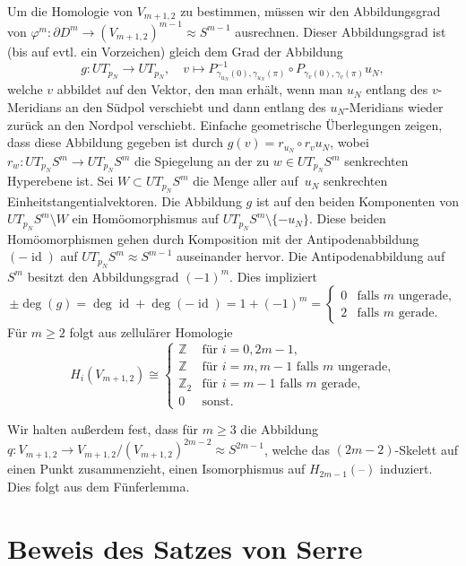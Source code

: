 \documentclass[11pt, a4paper, german]{article}
\theoremstyle{definition}
\theoremstyle{remark}
\newcommand{\R}{\mathbb{R}} %
\newcommand{\Z}{\mathbb{Z}} %
\DeclareMathOperator{\id}{id} %
\newcommand{\blank}{\text{--}} %
\newcommand{\V}[2]{V_{{#2},{#1}}} %
\newcommand{\homeo}{\approx} %
\begin{document}
Um die Homologie von $\V{2}{m+1}$ zu bestimmen, müssen wir den Abbildungsgrad von $\varphi^m : \partial D^m \to (\V{2}{m+1})^{m-1} \homeo S^{m-1}$ ausrechnen.
Dieser Abbildungsgrad ist (bis auf evtl. ein Vorzeichen) gleich dem Grad der Abbildung
\[
  g : UT_{p_N} \to UT_{p_N}, \quad
  v \mapsto P_{\gamma_{u_N}(0),\gamma_{u_N}(\pi)}^{-1} \circ P_{\gamma_v(0),\gamma_v(\pi)} u_N,
\]
welche $v$ abbildet auf den Vektor, den man erhält, wenn man $u_N$ entlang des $v$-Meridians an den Südpol verschiebt und dann entlang des $u_N$-Meridians wieder zurück an den Nordpol verschiebt.
Einfache geometrische Überlegungen zeigen, dass diese Abbildung gegeben ist durch $g(v) = r_{u_N} \circ r_{v} u_N$, wobei $r_w : UT_{p_N} S^m \to UT_{p_N} S^m$ die Spiegelung an der zu $w \in UT_{p_N} S^m$ senkrechten Hyperebene ist.
Sei $W \subset UT_{p_N} S^m$ die Menge aller auf~$u_N$ senkrechten Einheitstangentialvektoren.
Die Abbildung $g$ ist auf den beiden Komponenten von $UT_{p_N} S^m \setminus W$ ein Homöomorphismus auf $UT_{p_N} S^m \setminus \{ -u_N \}$.
Diese beiden Homöomorphismen gehen durch Komposition mit der Antipodenabbildung $(- \id)$ auf $UT_{p_N} S^m \homeo S^{m-1}$ auseinander hervor.
Die Antipodenabbildung auf~$S^m$ besitzt den Abbildungsgrad $(-1)^m$.
Dies impliziert
\[
  \pm \deg(g) = \deg \id + \deg (-\id) = 1 + (-1)^m = \begin{cases}
    0 & \text{falls $m$ ungerade,} \\
    2 & \text{falls $m$ gerade.}
  \end{cases}
\]
Für $m \geq 2$ folgt aus zellulärer Homologie
\[
  H_i(\V{2}{m+1}) \cong \begin{cases}
    \Z & \text{für } i = 0, 2m-1, \\
    \Z & \text{für } i = m, m-1 \text{ falls $m$ ungerade,} \\
    \Z_2 & \text{für } i = m-1 \text{ falls $m$ gerade,} \\
    0 & \text{sonst.}
  \end{cases}
\]

Wir halten außerdem fest, dass für $m \geq 3$ die Abbildung $q : \V{2}{m+1} \to \V{2}{m+1} / (\V{2}{m+1})^{2m-2} \homeo S^{2m-1}$, welche das $(2m-2)$-Skelett auf einen Punkt zusammenzieht, einen Isomorphismus auf $H_{2m-1}(\blank)$ induziert.
Dies folgt aus dem Fünferlemma.

\section{Beweis des Satzes von Serre}
\end{document}
